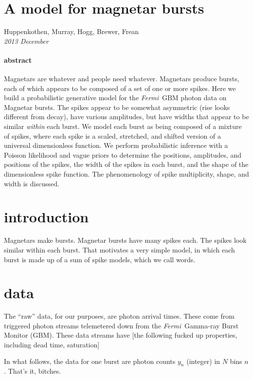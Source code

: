 \documentclass[12pt]{article}
\newcommand{\project}[1]{\textsl{#1}}
\newcommand{\Fermi}{\project{Fermi}}
\renewcommand{\count}{y}
\begin{document}
\section*{A model for magnetar bursts}

\noindent
Huppenkothen, Murray, Hogg, Brewer, Frean \\
\textsl{2013 December}

\paragraph{abstract}
Magnetars are whatever and people need whatever.
Magnetars produce bursts,
  each of which appears to be composed of a set of one or more spikes.
Here we build a probabilistic generative model for the \Fermi\ GBM photon data on Magnetar bursts.
The spikes appear to be somewhat asymmetric
  (rise looks different from decay),
  have various amplitudes,
  but have widths that appear to be similar \emph{within} each burst.
We model each burst as being composed of a mixture of spikes,
  where each spike is a scaled, stretched, and shifted version of a universal dimensionless function.
We perform probabilistic inference with a Poisson likelihood and vague priors to determine
  the positions, amplitudes, and positions of the spikes,
  the width of the spikes in each burst,
  and the shape of the dimensionless spike function.
The phenomenology of spike multiplicity, shape, and width is discussed.

\section{introduction}

Magnetars make bursts.
Magnetar bursts have many spikes each.
The spikes look similar within each burst.
That motivates a very simple model,
  in which each burst is made up of a sum of spike models, which we call words.

\section{data}

The ``raw'' data, for our purposes, are photon arrival times.
These come from triggered photon streams telemetered down from the \Fermi\ Gamma-ray Burst Monitor (GBM).
These data streams have [the following fucked up properties, including dead time, saturation]

In what follows, the data for one burst are photon counts $\count_n$
(integer) in $N$ bins $n$.  That's it, bitches.
\end{document}
